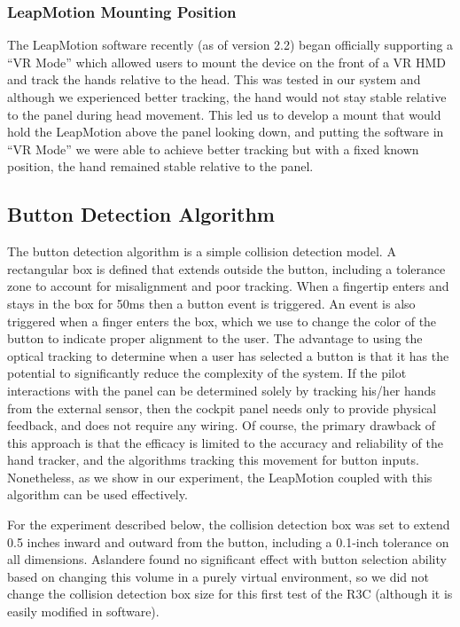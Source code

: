 \subsubsection{LeapMotion Mounting Position}
The LeapMotion software recently (as of version 2.2) began officially supporting a ``VR Mode'' which allowed users to mount the device on the front of a VR HMD and track the hands relative to the head.
This was tested in our system and although we experienced better tracking, the hand would not stay stable relative to the panel during head movement.
This led us to develop a mount that would hold the LeapMotion above the panel looking down, and putting the software in ``VR Mode'' we were able to achieve better tracking but with a fixed known position, the hand remained stable relative to the panel.

\subsection{Button Detection Algorithm}
\label{sec:pe_button}

The button detection algorithm is a simple collision detection model.
A rectangular box is defined that extends outside the button, including a tolerance zone to account for misalignment and poor tracking.
When a fingertip enters and stays in the box for 50ms then a button event is triggered.
An event is also triggered when a finger enters the box, which we use to change the color of the button to indicate proper alignment to the user.
The advantage to using the optical tracking to determine when a user has selected a button is that it has the potential to significantly reduce the complexity of the system.
If the pilot interactions with the panel can be determined solely by tracking his/her hands from the external sensor, then the cockpit panel needs only to provide physical feedback, and does not require any wiring.
Of course, the primary drawback of this approach is that the efficacy is limited to the accuracy and reliability of the hand tracker, and the algorithms tracking this movement for button inputs.
Nonetheless, as we show in our experiment, the LeapMotion coupled with this algorithm can be used effectively.

For the experiment described below, the collision detection box was set to extend 0.5 inches inward and outward from the button, including a 0.1-inch tolerance on all dimensions.
Aslandere \cite{t._aslandere_virtual_2015} found no significant effect with button selection ability based on changing this volume in a purely virtual environment, so we did not change the collision detection box size for this first test of the R3C (although it is easily modified in software).


